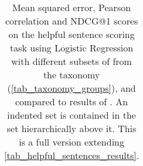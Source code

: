 \begin{table}[t]
{\begin{tabular}{clccc}
        \bottomrule
    \end{tabular}}
    \caption{Mean squared error, Pearson correlation and NDCG@1 scores on the helpful sentence scoring task using Logistic Regression with different subsets of \taxtypes{} from the taxonomy (\autoref{tab_taxonomy_groups}), and compared to results of \citet{gamzu2021helpfulsentences}. An indented set is contained in the set hierarchically above it. This is a full version extending \autoref{tab_helpful_sentences_results}.}
    \label{tab_helpful_sentences_results_full}
\end{table}